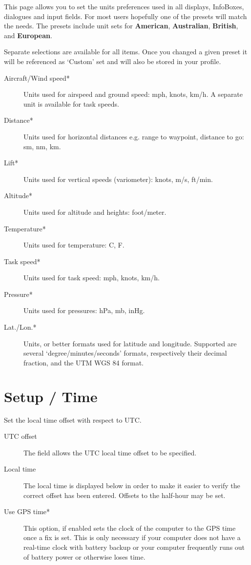 This page allows you to set the units preferences used in all
displays, InfoBoxes, dialogues and input fields.  
For most users hopefully one of the presets will match the needs.  The presets 
include unit sets for {\bf American}, {\bf Australian}, {\bf British}, 
and {\bf European}.

Separate selections are available for all items. Once you changed a given preset it 
will be referenced as `Custom' set and will also be stored in your profile.

\begin{description}
\item[Aircraft/Wind speed*]  Units used for airspeed and ground speed: mph, 
  knots, km/h. A separate unit is available for task speeds.
\item[Distance*]  Units used for horizontal distances e.g. range to waypoint, 
  distance to go: sm, nm, km.
\item[Lift*]  Units used for vertical speeds (variometer): knots, m/s, ft/min.
\item[Altitude*] Units used for altitude and heights: foot/meter.
\item[Temperature*]  Units used for temperature: \degree C, \degree F.
\item[Task speed*] Units used for task speed: mph, knots, km/h.
\item[Pressure*]  Units used for pressures: hPa, mb, inHg.
\item[Lat./Lon.*]  Units, or better formats used for latitude and longitude. 
  Supported are several `degree/minutes/seconds' formats, respectively 
  their decimal fraction, and the  UTM WGS 84 format.
\end{description}


\section{Setup / Time}

Set the local time offset with respect to UTC.

\begin{description}
\item[UTC offset]  The field allows the UTC local time offset to be specified.
\item[Local time]  The local time is displayed below in order to make it easier to verify
  the correct offset has been entered.  Offsets to the half-hour may be set.
\item[Use GPS time*] This option, if enabled sets the clock of the computer to 
  the GPS time once a fix is set. This is only necessary if your computer does 
  not have a real-time clock with battery backup or your computer 
  frequently runs out of battery power or otherwise loses time.
\end{description}


